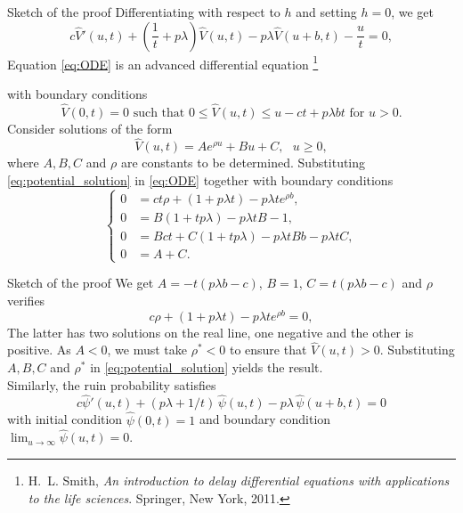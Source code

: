 \documentclass{beamer}
\newcommand\blfootnote[1]{%
  \begingroup
  \renewcommand\thefootnote{}\footnote{#1}%
  \addtocounter{footnote}{-1}%
  \endgroup
}
\begin{document}
\begin{frame}{Sketch of the proof}
\scriptsize
Differentiating with respect to $h$ and setting $h=0$, we get
\begin{equation}\label{eq:ODE}
c\widehat{V}'(u,t) + \left(\frac{1}{t} +  p\lambda\right)\widehat{V}(u,t) - p\lambda \widehat{V}(u+b,t) - \frac{u}{t} =0,
\end{equation}
Equation \eqref{eq:ODE} is an advanced differential equation
\blfootnote{\tiny 
 H.~L. Smith, {\em An introduction to delay differential equations with
  applications to the life sciences}.
\newblock Springer, New York, 2011.
}
with boundary conditions
$$
\widehat{V}(0,t) = 0 \text{ such that } 0\leq \widehat{V}(u,t)\leq u-ct+p\lambda b t \text{ for }u>0.
$$  
Consider solutions of the form 
\begin{equation}\label{eq:potential_solution}
\widehat{V}(u,t) = Ae^{\rho u }+Bu + C,\text{ }u \ge 0, 
\end{equation}
where $A, B,C$ and $\rho$ are constants to be determined. Substituting \eqref{eq:potential_solution} in \eqref{eq:ODE} together with boundary conditions
\begin{equation*}
\begin{cases}
0&=ct\rho + \left(1+p\lambda t\right)-p\lambda te^{\rho b}, \\
0&= B\left(1+tp\lambda\right)-p\lambda tB - 1,\\
0&=Bct+C(1+tp\lambda) - p\lambda t Bb-p\lambda tC, \\
0&=A+C.
\end{cases}
\end{equation*}
\end{frame}
\begin{frame}{Sketch of the proof}
\scriptsize
We get $A = -t(p\lambda b - c)$, $B = 1$, $C = t(p\lambda b - c)$ and $\rho$ verifies
$$
c\rho + \left(1+p\lambda t\right)-p\lambda te^{\rho b} = 0,
$$
The latter has two solutions on the real line, one negative and the other is positive. As $A<0$, we must take  $\rho^\ast<0$ to ensure that $\widehat{V}(u,t)>0$. Substituting $A,B,C$ and $\rho^{\ast}$ in \eqref{eq:potential_solution} yields the result.\\

Similarly, the ruin probability satisfies
\begin{equation*}\label{psii}
c\widehat{\psi}'(u,t)+(p \lambda+1/t)\,\widehat{\psi}(u,t)-p \lambda\,\widehat{\psi}(u+b,t)=0
\end{equation*}
with initial condition $\widehat{\psi}(0,t)=1$ and boundary condition $\lim_{u\to\infty}\widehat{\psi}(u,t)=0$.
\end{frame}
\end{document}
